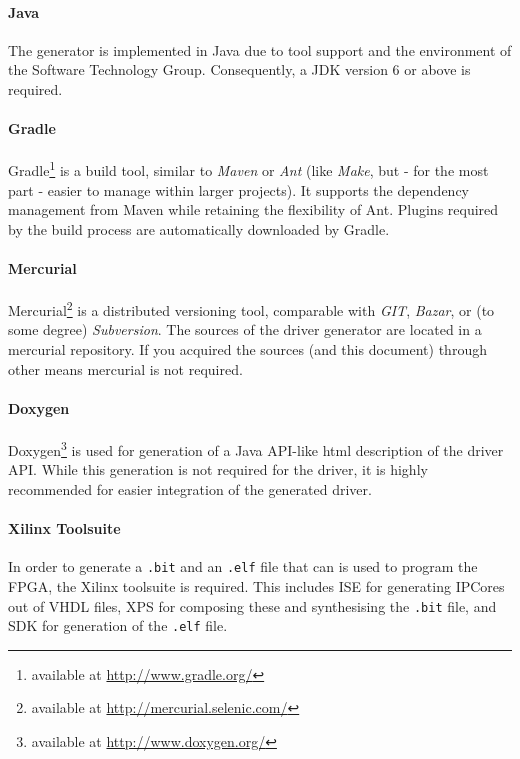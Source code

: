\documentclass{report}
\begin{document}
\paragraph{Java}
The generator is implemented in Java due to tool support and the environment of the Software Technology Group. Consequently, a JDK version 6 or above is required. %

\paragraph{Gradle}
Gradle\footnote{available at \url{http://www.gradle.org/}} is a build tool, similar to \textit{Maven} or \textit{Ant} (like \textit{Make}, but - for the most part - easier to manage within larger projects). It supports the dependency management from Maven while retaining the flexibility of Ant. Plugins required by the build process are automatically downloaded by Gradle.

\paragraph{Mercurial}
Mercurial\footnote{available at \url{http://mercurial.selenic.com/}} is a distributed versioning tool, comparable with \textit{GIT}, \textit{Bazar}, or (to some degree) \textit{Subversion}. The sources of the driver generator are located in a mercurial repository. If you acquired the sources (and this document) through other means mercurial is not required.

\paragraph{Doxygen}
Doxygen\footnote{available at \url{http://www.doxygen.org/}} is used for generation of a Java API-like html description of the driver API. While this generation is not required for the driver, it is highly recommended for easier integration of the generated driver.

\paragraph{Xilinx Toolsuite}
In order to generate a \texttt{.bit} and an \texttt{.elf} file that can is used to program the FPGA, the Xilinx toolsuite is required. This includes ISE for generating IPCores out of VHDL files, XPS for composing these and synthesising the \texttt{.bit} file, and SDK for generation of the \texttt{.elf} file.
\end{document}
